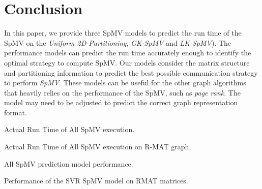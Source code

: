 \documentclass[sigconf,review,anonymous]{acmart}
\begin{document}
\section{Conclusion}
In this paper, we provide three SpMV models to predict the run time of the
SpMV on the \textit{Uniform 2D-Partitioning}, \textit{GK-SpMV} and \textit{LK-SpMV}). 
The performance models can predict the run time accurately enough to identify the
optimal strategy to compute SpMV. Our models consider the matrix structure and partitioning information to 
predict the best possible communication strategy to perform
\textit{SpMV}. These models can be useful for the other graph
algorithms that heavily relies on the performance of the SpMV, such as
\textit{page rank}. The model may need to be adjusted to predict the
correct graph representation format.


\begin{table}
\caption{Actual Run Time of All SpMV execution.}
\label{tab:actual_time_table}
\let\center\empty
\let\endcenter\relax
\centering
\resizebox{.88\width}{!}{}
\end{table}

\begin{table}
\caption{Actual Run Time of All SpMV execution on R-MAT graph.}
\label{tab:rmat-actual_time_table}
\let\center\empty
\let\endcenter\relax
\centering
\resizebox{.88\width}{!}{}
\end{table}

\begin{table}
\caption{All SpMV prediction model performance.}
\label{tab:performance_table}
\let\center\empty
\let\endcenter\relax
\centering
\resizebox{.58\width}{!}{}
\end{table}


\begin{table}
\caption{Performance of the SVR SpMV model on RMAT matrices.}
\label{tab:performance_table_rmat}
\let\center\empty
\let\endcenter\relax
\centering
\resizebox{.58\width}{!}{}
\end{table}




\end{document}
